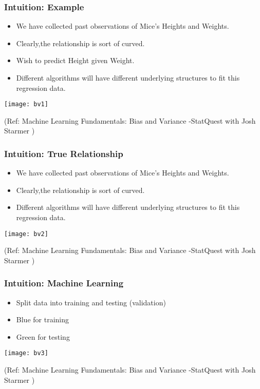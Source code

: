 

\begin{frame}[fragile]\frametitle{Intuition: Example}
	\begin{itemize}
	\item We have collected past observations of Mice's Heights and Weights.
	\item Clearly,the relationship is sort of curved.
	\item Wish to predict Height given Weight.
	\item Different algorithms will have different underlying structures to fit this regression data.
	\end{itemize}
	
\begin{center}
\texttt{[image: bv1]}
\end{center}
	
\tiny{(Ref: Machine Learning Fundamentals: Bias and Variance -StatQuest with Josh Starmer )}
\end{frame}

\begin{frame}[fragile]\frametitle{Intuition: True Relationship}
	\begin{itemize}
	\item We have collected past observations of Mice's Heights and Weights.
	\item Clearly,the relationship is sort of curved.
	\item Different algorithms will have different underlying structures to fit this regression data.
	\end{itemize}
	
\begin{center}
\texttt{[image: bv2]}
\end{center}
	
\tiny{(Ref: Machine Learning Fundamentals: Bias and Variance -StatQuest with Josh Starmer )}
\end{frame}

\begin{frame}[fragile]\frametitle{Intuition: Machine Learning}
	\begin{itemize}
	\item Split data into training and testing (validation)
	\item Blue for training
	\item Green for testing
	\end{itemize}
	
\begin{center}
\texttt{[image: bv3]}
\end{center}
	
\tiny{(Ref: Machine Learning Fundamentals: Bias and Variance -StatQuest with Josh Starmer )}
\end{frame}

